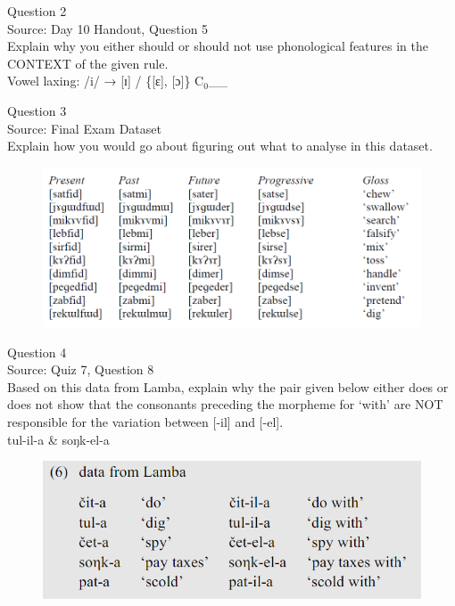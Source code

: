 \documentclass[12pt]{article}
\begin{document}
\newpage

{\large Question 2}\\

Source: Day 10 Handout, Question 5\\

Explain why you either should or should not use phonological features in the CONTEXT of the given rule.\\

Vowel laxing: /i/ → {[ɪ]} / \{{[ɛ]}, {[ɔ]}\} C$_0$\_\_


\newpage

{\large Question 3}\\

Source: Final Exam Dataset\\

Explain how you would go about figuring out what to analyse in this dataset.\\

\begin{figure}[H]
\includegraphics{../images/final_dataset.png}
\end{figure}

\newpage

{\large Question 4}\\

Source: Quiz 7, Question 8\\

Based on this data from Lamba, explain why the pair given below either does or does not show that the consonants preceding the morpheme for `with' are NOT responsible for the variation between [-il] and [-el].\\

tul-il-a \& soŋk-el-a

\begin{figure}[H]
\includegraphics{../images/peng119_lamba.png}
\end{figure}
\end{document}

